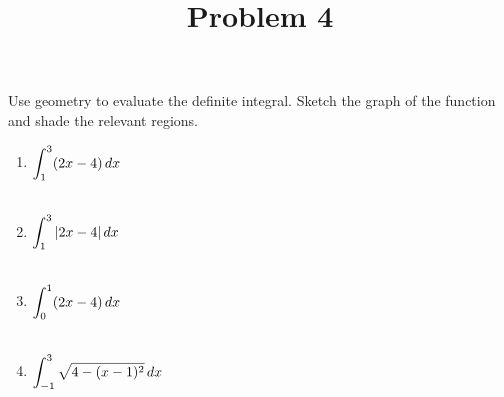 \documentclass{ximera}
\title[Problem 4]{Problem 4}
\begin{document}
\begin{abstract} \end{abstract}
\maketitle

\begin{problem}
Use geometry to evaluate the definite integral.  Sketch the graph of the function and shade the relevant regions.
\begin{enumerate}

	\item $\displaystyle \int_1^3 (2x-4) \,d x$ \\ \\

\item $\displaystyle \int_1^3 |2x-4| \,d x$ \\ \\

\item  $\displaystyle \int_0^1 (2x-4) \,d x$ \\ \\

\item  $\displaystyle \int_{-1}^3 \sqrt{4-(x-1)^2} \,d x$
		
\end{enumerate}

\end{problem}
\end{document}
